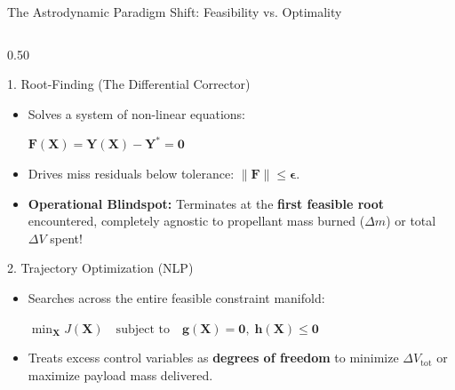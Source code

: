\documentclass[aspectratio=169, 10pt]{beamer}
\begin{document}
\begin{frame}{The Astrodynamic Paradigm Shift: Feasibility vs. Optimality}
    \begin{columns}[t]
        \begin{column}{0.50\textwidth}
            \begin{block}{1. Root-Finding (The Differential Corrector)}
                \scriptsize
                \begin{itemize}\setlength{\itemsep}{1.2pt}
                    \item Solves a system of non-linear equations:
                    \par\vspace{1pt}
                    {\centering $\mathbf{F}(\mathbf{X}) = \mathbf{Y}(\mathbf{X}) - \mathbf{Y}^* = \mathbf{0}$\par}
                    \item Drives miss residuals below tolerance: $\|\mathbf{F}\| \le \boldsymbol{\epsilon}$.
                    \item \textbf{Operational Blindspot:} Terminates at the \textbf{first feasible root} encountered, completely agnostic to propellant mass burned ($\Delta m$) or total $\Delta V$ spent!
                \end{itemize}
            \end{block}

            \vspace{-0.08cm}

            \begin{block}{2. Trajectory Optimization (NLP)}
                \scriptsize
                \begin{itemize}\setlength{\itemsep}{1.2pt}
                    \item Searches across the entire feasible constraint manifold:
                    \par\vspace{1pt}
                    {\centering $\min_{\mathbf{X}} J(\mathbf{X}) \quad \text{subject to} \quad \mathbf{g}(\mathbf{X}) = \mathbf{0}, \; \mathbf{h}(\mathbf{X}) \le \mathbf{0}$\par}
                    \item Treats excess control variables as \textbf{degrees of freedom} to minimize $\Delta V_{\text{tot}}$ or maximize payload mass delivered.
                \end{itemize}
            \end{block}
        \end{column}


\end{columns}
\end{frame}
\end{document}
